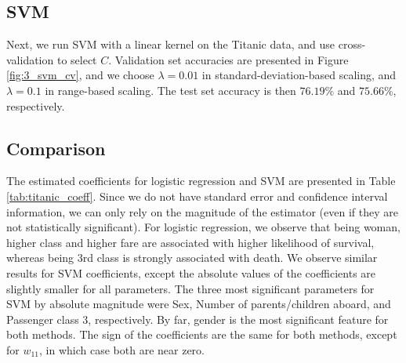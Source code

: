 \subsection{SVM}
Next, we run SVM with a linear kernel on the Titanic data, and use cross-validation to select $C$.  Validation set accuracies are presented in Figure \ref{fig:3_svm_cv}, and we choose $\lambda = 0.01$ in standard-deviation-based scaling, and $\lambda = 0.1$ in range-based scaling. The test set accuracy is then $76.19\%$ and $75.66\%$, respectively.

\subsection{Comparison}
The estimated coefficients for logistic regression and SVM are presented in Table \ref{tab:titanic_coeff}. Since we do not have standard error and confidence interval information, we can only rely on the magnitude of the estimator (even if they are not statistically significant). For logistic regression, we observe that being woman, higher class and higher fare are associated with higher likelihood of survival, whereas being 3rd class is strongly associated with death. We observe similar results for SVM coefficients, except the absolute values of the coefficients are slightly smaller for all parameters.  The three most significant parameters for SVM by absolute magnitude were Sex, Number of parents/children aboard, and Passenger class 3, respectively. By far, gender is the most significant feature for both methods.  The sign of the coefficients are the same for both methods, except for $w_{11}$, in which case both are near zero.  

